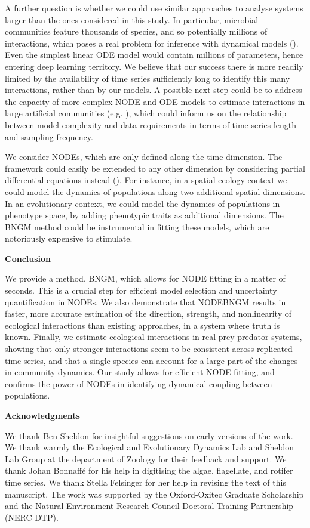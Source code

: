 \documentclass[11pt, oneside]{article}
\begin{document}
A further question is whether we could use similar approaches to analyse systems larger than the ones considered in this study.
In particular, microbial communities feature thousands of species, and so potentially millions of interactions, which poses a real problem for inference with dynamical models (\cite{Ridenhour2017}).
Even the simplest linear ODE model would contain millions of parameters, hence entering deep learning territory.
We believe that our success there is more readily limited by the availability of time series sufficiently long to identify this many interactions, rather than by our models.
A possible next step could be to address the capacity of more complex NODE and ODE models to estimate interactions in large artificial communities (e.g. \cite{Coenen2020}), which could inform us on the relationship between model complexity and data requirements in terms of time series length and sampling frequency.

We consider NODEs, which are only defined along the time dimension.
The framework could easily be extended to any other dimension by considering partial differential equations instead (\cite{Rackauckas2019}).
For instance, in a spatial ecology context we could model the dynamics of populations along two additional spatial dimensions.
In an evolutionary context, we could model the dynamics of populations in phenotype space, by adding phenotypic traits as additional dimensions.
The BNGM method could be instrumental in fitting these models, which are notoriously expensive to stimulate.

\textbf{Conclusion}

We provide a method, BNGM, which allows for NODE fitting in a matter of seconds.
This is a crucial step for efficient model selection and uncertainty quantification in NODEs.
We also demonstrate that NODEBNGM results in faster, more accurate estimation of the direction, strength, and nonlinearity of ecological interactions than existing approaches, in a system where truth is known.
Finally, we estimate ecological interactions in real prey predator systems, showing that only stronger interactions seem to be consistent across replicated time series, and that a single species can account for a large part of the changes in community dynamics.
Our study allows for efficient NODE fitting, and confirms the power of NODEs in identifying dynamical coupling between populations. 

\textbf{Acknowledgments}

We thank Ben Sheldon for insightful suggestions on early versions of the work.
We thank warmly the Ecological and Evolutionary Dynamics Lab and Sheldon Lab Group at the department of Zoology for their feedback and support.
We thank Johan Bonnaff\'e for his help in digitising the algae, flagellate, and rotifer time series.
We thank Stella Felsinger for her help in revising the text of this manuscript.
The work was supported by the Oxford-Oxitec Graduate Scholarship and the Natural Environment Research Council Doctoral Training Partnership (NERC DTP).
\end{document}
